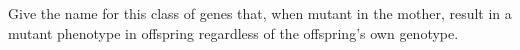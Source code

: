\mult
Give the name for this class of genes that,
when mutant in the
mother,
result in a mutant phenotype in offspring regardless of the offspring's own
genotype.

